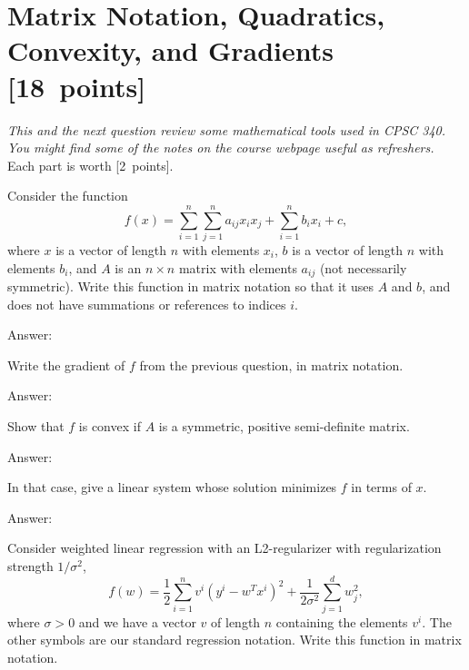 \documentclass{article}
\newcommand{\ask}[1]{\textcolor{question}{#1}}
\newenvironment{answer}{\par\begingroup\color{answer}Answer: }{\endgroup}
\newcommand{\pts}[1]{\textcolor{points}{[#1~points]}}
\newcommand{\meta}[1]{\textcolor{black!60!white}{\emph{#1}}}
\newcommand{\TODO}{\color{red}{TODO}}
\begin{document}
\clearpage

\section{Matrix Notation, Quadratics, Convexity, and Gradients \pts{18}} \label{q:mat}
\meta{This and the next question review some mathematical tools used in CPSC 340. You might find some of the notes on the course webpage useful as refreshers.}
Each part is worth \pts{2}.

\begin{qlist}
\item Consider the function
\[
f(x) = \sum_{i=1}^n\sum_{j=1}^n a_{ij}x_ix_j + \sum_{i=1}^n b_ix_i + c,
\]
where $x$ is a vector of length $n$ with elements $x_i$, $b$ is a vector of length $n$ with elements $b_i$, and $A$ is an $n \times n$ matrix with elements $a_{ij}$ (not necessarily symmetric). \ask{Write this function in matrix notation} so that it uses $A$ and $b$, and does not have summations or references to indices $i$.

\begin{answer}\TODO\end{answer}

\item \ask{Write the gradient of $f$ from the previous question, in matrix notation}.
\begin{answer}\TODO\end{answer}

\item \label{q:mat:quad-conv} \ask{Show that $f$ is convex} if $A$ is a symmetric, positive semi-definite matrix.

\begin{answer}\TODO\end{answer}

\item In that case, \ask{give a linear system whose solution minimizes $f$ in terms of $x$}.

\begin{answer}\TODO\end{answer}

\item Consider weighted linear regression with an L2-regularizer with regularization strength $1/\sigma^2$,
\[
f(w) = \frac12 \sum_{i=1}^n v^i(y^i - w^Tx^i)^2 + \frac{1}{2\sigma^2}\sum_{j=1}^d w_j^2,
\]
where $\sigma > 0$ and we have a vector $v$ of length $n$ containing the elements $v^i$. The other symbols are our standard regression notation. \ask{Write this function in matrix notation}.


\end{qlist}
\end{document}
